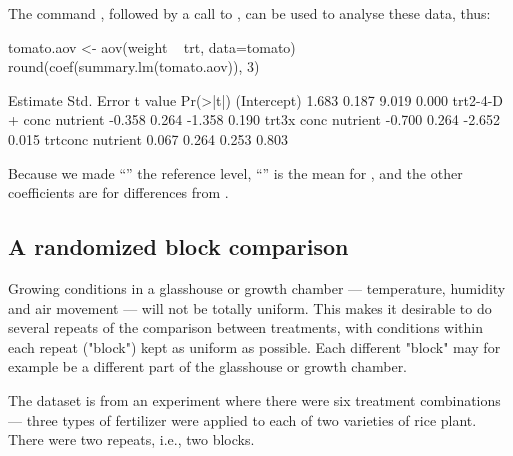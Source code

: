 The command , followed by a call to ,
can be used to analyse these data, thus:
\begin{Schunk}
\begin{Sinput}
tomato.aov <- aov(weight ~ trt, data=tomato)
round(coef(summary.lm(tomato.aov)), 3)
\end{Sinput}
\end{Schunk}
\begin{fullwidth}

\begin{Schunk}
\begin{Soutput}
                         Estimate Std. Error t value Pr(>|t|)
(Intercept)                 1.683      0.187   9.019    0.000
trt2-4-D + conc nutrient   -0.358      0.264  -1.358    0.190
trt3x conc nutrient        -0.700      0.264  -2.652    0.015
trtconc nutrient            0.067      0.264   0.253    0.803
\end{Soutput}
\end{Schunk}

\end{fullwidth}
Because we made ``'' the reference level,
``'' is the mean for , and the
other coefficients are for differences from .

\subsection*{A randomized block comparison}

Growing conditions in a glasshouse or growth chamber ---
temperature, humidity and air movement --- will not be totally
uniform. This makes it desirable to do several repeats of the
comparison between treatments, with conditions
within each repeat  ("block") kept as uniform as possible.
Each different "block" may for example be a different part of
the glasshouse or growth chamber.

The dataset  is from an experiment
where there were six treatment combinations ---
three types of fertilizer were applied to each of two varieties
of rice plant.  There were two repeats, i.e., two blocks.

